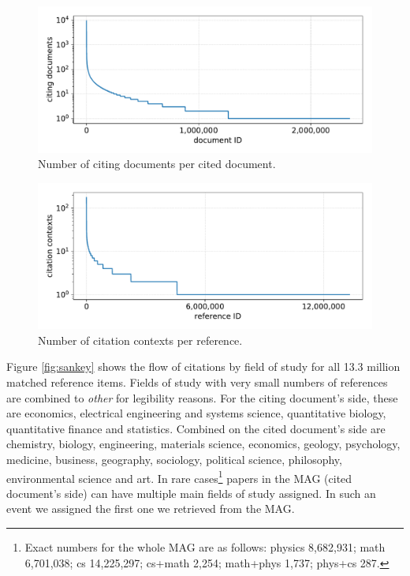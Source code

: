 \begin{figure}[tb]
  \centering
  \includegraphics[width=\linewidth]{figures/dataset/citing_docs_per_cited_doc.pdf}
  \caption{Number of citing documents per cited document.}
  \label{fig:numcitdoc}
\end{figure}

\begin{figure}[tb]
  \centering
  \includegraphics[width=\linewidth]{figures/dataset/citation_contexts_per_reference.pdf}
  \caption{Number of citation contexts per reference.}
  \label{fig:numcontref}
\end{figure}

Figure \ref{fig:sankey} shows the flow of citations by field of study for all 13.3 million matched reference items. Fields of study with very small numbers of references are combined to \emph{other} for legibility reasons. For the citing document's side, these are economics, electrical engineering and systems science, quantitative biology, quantitative finance and statistics. Combined on the cited document's side are chemistry, biology, engineering, materials science, economics, geology, psychology, medicine, business, geography, sociology, political science, philosophy, environmental science and art. In rare cases\footnote{Exact numbers for the whole MAG are as follows: physics 8,682,931; math 6,701,038; cs 14,225,297; cs+math 2,254; math+phys 1,737; phys+cs 287.} papers in the MAG (cited document's side) can have multiple main fields of study assigned. In such an event we assigned the first one we retrieved from the MAG.

